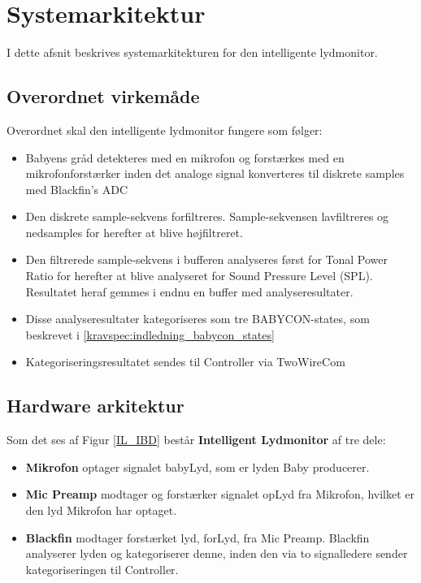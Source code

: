 \newpage
\section{Systemarkitektur}

I dette afsnit beskrives systemarkitekturen for den intelligente lydmonitor.

\subsection*{Overordnet virkemåde}
Overordnet skal den intelligente lydmonitor fungere som følger:
\begin{itemize}
	\item Babyens gråd detekteres med en mikrofon og forstærkes med en mikrofonforstærker inden det analoge signal konverteres til diskrete samples med Blackfin's ADC
	\item Den diskrete sample-sekvens forfiltreres. Sample-sekvensen lavfiltreres og nedsamples for herefter at blive højfiltreret. 
	\item Den filtrerede sample-sekvens i bufferen analyseres først for Tonal Power Ratio for herefter at blive analyseret for Sound Pressure Level (SPL). Resultatet heraf gemmes i endnu en buffer med analyseresultater.
	\item Disse analyseresultater kategoriseres som tre BABYCON-states, som beskrevet i \ref{kravspec:indledning_babycon_states} 
	\item Kategoriseringsresultatet sendes til Controller via TwoWireCom
\end{itemize}


\newpage
\subsection{Hardware arkitektur}

Som det ses af Figur \ref{IL_IBD} består \textbf{Intelligent Lydmonitor} af tre dele: 
\begin{itemize}
\item \textbf{Mikrofon} optager signalet babyLyd, som er lyden Baby producerer. 
\item \textbf{Mic Preamp} modtager og forstærker signalet opLyd fra Mikrofon, hvilket er den lyd Mikrofon har optaget. 
\item \textbf{Blackfin} modtager forstærket lyd, forLyd, fra Mic Preamp. Blackfin analyserer lyden og kategoriserer denne, inden den via to signalledere sender kategoriseringen til Controller. 
\end{itemize}

